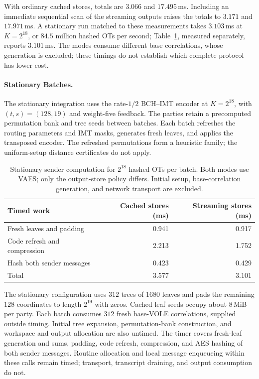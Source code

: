 With ordinary cached stores, totals are $3.066$ and $17.495$\,ms.
Including an immediate sequential scan of the streaming outputs raises
the totals to $3.171$ and $17.971$\,ms. A stationary run matched to these
measurements takes $3.103$\,ms at $K=2^{18}$, or $84.5$ million hashed OTs
per second; Table~\ref{tab:spin-stationary-ot}, measured separately,
reports $3.101$\,ms.
The modes consume different base correlations, whose generation is excluded;
these timings do not establish which complete protocol has lower cost.

\paragraph{Stationary Batches.}
The stationary integration uses the rate-$1/2$ BCH--IMT encoder at $K=2^{18}$,
with $(t,s)=(128,19)$ and weight-five feedback.
The parties retain a precomputed permutation bank and tree seeds between
batches. Each batch refreshes the routing parameters and IMT masks, generates
fresh leaves, and applies the transposed encoder. The refreshed permutations
form a heuristic family; the uniform-setup distance certificates do not apply.

\begin{table}[!htbp]
\centering
\caption{Stationary sender computation for $2^{18}$ hashed OTs per batch.
Both modes use VAES; only the output-store policy differs.
Initial setup, base-correlation generation, and network transport are excluded.}
\label{tab:spin-stationary-ot}
\begin{tabular}{@{}lrr@{}}
\toprule
Timed work & Cached stores (ms) & Streaming stores (ms) \\
\midrule
Fresh leaves and padding & 0.941 & 0.917 \\
Code refresh and compression & 2.213 & 1.752 \\
Hash both sender messages & 0.423 & 0.429 \\
Total & 3.577 & 3.101 \\
\bottomrule
\end{tabular}
\end{table}

The stationary configuration uses $312$ trees of $1680$ leaves and pads the
remaining $128$ coordinates to length $2^{19}$ with zeros. Cached leaf seeds
occupy about $8$\,MiB per party. Each batch consumes $312$ fresh base-VOLE
correlations, supplied outside timing. Initial tree expansion, permutation-bank
construction, and workspace and output allocation are also untimed.
The timer covers fresh-leaf generation and sums, padding, code refresh,
compression, and AES hashing of both sender messages.
Routine allocation and local message enqueueing within these calls remain
timed; transport, transcript draining, and output consumption do not.

